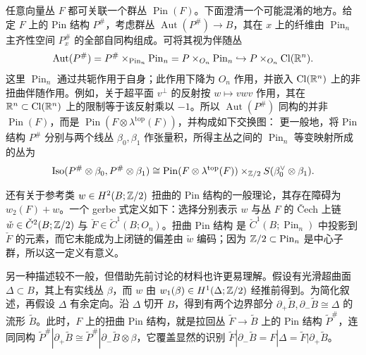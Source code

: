 任意向量丛 $F$ 都可关联一个群丛 $\operatorname{Pin}(F)$。下面澄清一个可能混淆的地方。给定 $F$ 上的 Pin 结构 $P^\#$，考虑群丛 $\operatorname{Aut}(P^\#)\to B$，其在 $x$ 上的纤维由 $\operatorname{Pin}_n$ 主齐性空间 $P_x^\#$ 的全部自同构组成。可将其视为伴随丛
\[
\operatorname{Aut}(P^\#)=P^\#\times_{\operatorname{Pin}_n}\operatorname{Pin}_n
=P\times_{O_n}\operatorname{Pin}_n\hookrightarrow P\times_{O_n}\operatorname{Cl}(\mathbb R^n).
\]
这里 $\operatorname{Pin}_n$ 通过共轭作用于自身；此作用下降为 $O_n$ 作用，并嵌入 $\operatorname{Cl}(\mathbb R^n)$ 上的非扭曲伴随作用。例如，关于超平面 $v^\perp$ 的反射按 $w\mapsto vwv$ 作用，其在 $\mathbb R^n\subset\operatorname{Cl}(\mathbb R^n)$ 上的限制等于该反射乘以 $-1$。所以 $\operatorname{Aut}(P^\#)$ 同构的并非 $\operatorname{Pin}(F)$，而是 $\operatorname{Pin}(F\otimes\lambda^{\mathrm{top}}(F))$，并构成如下交换图：
更一般地，将 Pin 结构 $P^\#$ 分别与两个线丛 $\beta_0,\allowbreak \beta_1$ 作张量积，所得主丛之间的 $\operatorname{Pin}_n$ 等变映射所成的丛为
\begin{equation}\label{eq:11.31}
\operatorname{Iso}(P^\#\otimes\beta_0,P^\#\otimes\beta_1)
\cong\operatorname{Pin}(F\otimes\lambda^{\mathrm{top}}(F))\times_{\mathbb Z/2}S(\beta_0^\vee\otimes\beta_1).
\end{equation}
\begin{note}\label{st:11.16}
还有关于参考类 $w\in H^2(B;\mathbb Z/2)$ 扭曲的 Pin 结构的一般理论，其存在障碍为 $w_2(F)+w$。一个 gerbe 式定义如下：选择分别表示 $w$ 与丛 $F$ 的 Čech 上链 $\check w\in\check C^2(B;\mathbb Z/2)$ 与 $\check F\in\check C^1(B;O_n)$。扭曲 Pin 结构
是 $\check C^1(B;\operatorname{Pin}_n)$ 中投影到 $\check F$ 的元素，而它未能成为上闭链的偏差由 $\check w$ 编码；因为 $\mathbb Z/2\subset\operatorname{Pin}_n$ 是中心子群，所以这一定义有意义。

另一种描述较不一般，但借助先前讨论的材料也许更易理解。假设有光滑超曲面 $\Delta\subset B$，其上有实线丛 $\beta$，而 $w$ 由 $w_1(\beta)\in H^1(\Delta;\mathbb Z/2)$ 经推前得到。为简化叙述，再假设 $\Delta$ 有余定向。沿 $\Delta$ 切开 $B$，得到有两个边界部分 $\partial_+\widetilde B,\allowbreak \partial_-\widetilde B\cong\Delta$ 的流形 $\widetilde B$。此时，$F$ 上的扭曲 Pin 结构，就是拉回丛 $\widetilde F\to\widetilde B$ 上的 Pin 结构 $\widetilde P^\#$，连同同构 $\widetilde P^\#|\partial_+\widetilde B\cong\widetilde P^\#|\partial_-\widetilde B\otimes\beta$，它覆盖显然的识别 $\widetilde F|\partial_-\widetilde B=F|\Delta=\widetilde F|\partial_+\widetilde B$。
\end{note}

